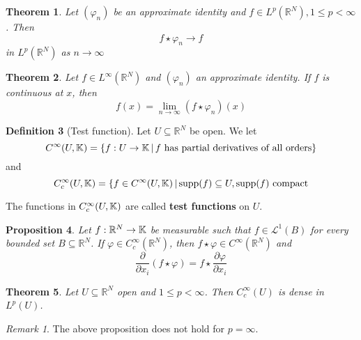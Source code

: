 \documentclass[10pt, oneside, reqno]{amsart}
\theoremstyle{plain}%
\newtheorem{thm}{Theorem}[section]
\newtheorem{prop}[thm]{Proposition}
\theoremstyle{definition}
\newtheorem{defn}[thm]{Definition}
\theoremstyle{remark}
\newtheorem*{rem}{Remark}
\newcommand{\R}{\mathbb{R}}
\renewcommand{\phi}{\varphi}
\begin{document}
\begin{thm}
    Let $(\phi_n)$ be an approximate identity and $f \in L^p(\R^N), 1 \leq p < \infty$.  Then \[
        f \star \phi_n \rightarrow f
    \] in $L^p(\R^N)$ as $n \rightarrow \infty$
\end{thm}

\begin{thm}
    Let $f \in L^\infty(\R^N)$ and $(\phi_n)$ an approximate identity.  If $f$ is continuous at $x$, then \[
        f(x) = \lim_{n \rightarrow \infty} (f \star \phi_n) (x)
    \]
\end{thm}



\begin{defn}[Test function]
    Let $U \subseteq \R^N$ be open.  We let \[
        C^\infty (U, \mathbb{K}) = \{ f: U \rightarrow \mathbb{K} \, | \, f \text{ has partial derivatives of all orders} \}
    \]
    and \[
        C_c^\infty(U, \mathbb{K}) = \{ f \in C^\infty(U, \mathbb{K}) \, | \, \text{supp}(f) \subseteq U, \text{supp($f$) compact}
    \]
    
    The functions in $C_c^\infty(U, \mathbb{K})$ are called \textbf{test functions} on $U$.
\end{defn}

\begin{prop}
    Let $f : \R^N \rightarrow \K$ be measurable such that $f \in \mathcal{L}^1(B)$ for every bounded set $B \subseteq \R^N$.  If $\phi \in C_c^\infty(\R^N)$, then $f \star \phi \in C^\infty(\R^N)$ and \[
        \frac{\partial}{\partial x_i} (f \star \phi) = f \star \frac{\partial \phi}{\partial x_i}
    \]
\end{prop}

\begin{thm}
    Let $U \subseteq \R^N$ open and $1 \leq p < \infty$.  Then $C_c^\infty(U)$ is dense in $L^p(U)$.
\end{thm}
\begin{rem}
    The above proposition does not hold for $p = \infty$.
\end{rem}



















\end{document}
